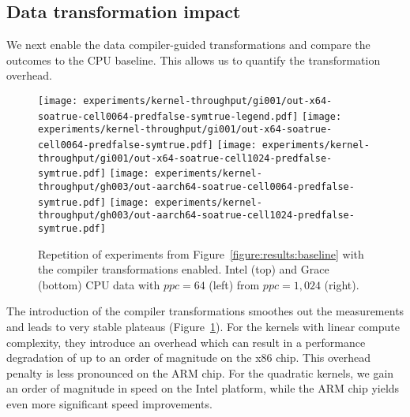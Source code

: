 \subsection{Data transformation impact}


%
%
We next enable the data compiler-guided transformations and compare the outcomes to the CPU baseline.
This allows us to quantify the transformation overhead.

\begin{figure}[htb]
  \begin{center}
    \texttt{[image: experiments/kernel-throughput/gi001/out-x64-soatrue-cell0064-predfalse-symtrue-legend.pdf]}
    \texttt{[image: experiments/kernel-throughput/gi001/out-x64-soatrue-cell0064-predfalse-symtrue.pdf]}
    \texttt{[image: experiments/kernel-throughput/gi001/out-x64-soatrue-cell1024-predfalse-symtrue.pdf]}     
    \texttt{[image: experiments/kernel-throughput/gh003/out-aarch64-soatrue-cell0064-predfalse-symtrue.pdf]}
    \texttt{[image: experiments/kernel-throughput/gh003/out-aarch64-soatrue-cell1024-predfalse-symtrue.pdf]}     
  \end{center}
  \caption{
    Repetition of experiments from Figure~\ref{figure:results:baseline} with the compiler transformations enabled.
    Intel (top) and Grace (bottom) CPU data with $ppc=64$ (left) from $ppc=1,024$ (right).
   \label{figure:results:overhead}
  }
\end{figure}

%
%
The introduction of the compiler transformations smoothes out the measurements and leads to very stable plateaus (Figure~\ref{figure:results:overhead}).
For the kernels with linear compute complexity, they introduce an overhead which can result in a performance degradation of up to an order of magnitude on the x86 chip.
This overhead penalty is less pronounced on the ARM chip.
For the quadratic kernels, we gain an order of magnitude in speed on the Intel platform, while the ARM chip yields even more significant speed improvements.

